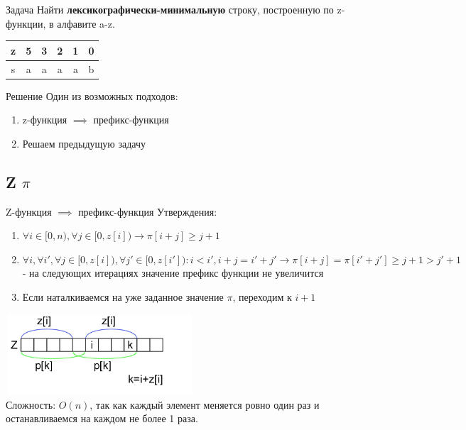 \documentclass[10pt]{beamer}
\begin{document}
\begin{frame}[fragile]{Задача}
Найти \textbf{лексикографически-минимальную} строку, построенную по z-функции, в алфавите a-z.
\begin{center}
\begin{tabular}{ |c|ccccc| } 
\hline
z & 5 & 3 & 2 & 1 & 0 \\ 
 \hline
 s & a & a & a & a & b\\ 
 \hline
\end{tabular}
\end{center}
\end{frame}

\begin{frame}[fragile]{Решение}
Один из возможных подходов:
\begin{enumerate}
\item z-функция $\implies$ префикс-функция
\item Решаем предыдущую задачу
\end{enumerate}
\end{frame}

\subsection{Z \rightarrow $\pi$}
\begin{frame}[fragile]{Z-функция $\implies$ префикс-функция}
Утверждения:
\begin{enumerate}
\item $\forall i \in [0, n), \forall j \in [0, z[i]) \rightarrow \pi[i+j] \ge j+1 $ 
\item $\forall i, \forall i', \forall j \in [0, z[i]), \forall j' \in [0, z[i']) :i < i', i+j = i'+j' \rightarrow \pi[i+j] = \pi[i'+j'] \ge j + 1 > j' + 1$ - на следующих итерациях значение префикс функции не увеличится
\item Если наталкиваемся на уже заданное значение $\pi$, переходим к $i+1$
\end{enumerate}
\includegraphics[width=7cm, height=3cm]{Term_3/Source/Pictures/z_to_p.jpg}\\

Сложность: $O(n)$, так как каждый элемент меняется ровно один раз и останавливаемся на каждом не более 1 раза.
\end{frame}
\end{document}

